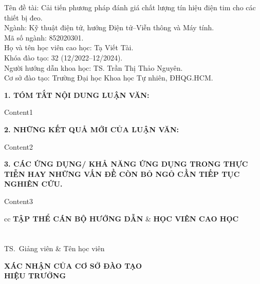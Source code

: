 \begin{flushleft}
	Tên đề tài: Cải tiến phương pháp đánh giá chất lượng tín hiệu điện tim cho các thiết bị đeo. \\
	Ngành: Kỹ thuật điện tử, hướng Điện tử--Viễn thông và Máy tính. \\
	Mã số ngành: 852020301. \\
	Họ và tên học viên cao học: Tạ Viết Tài. \\
	Khóa đào tạo: 32 (12/2022--12/2024). \\
	Người hướng dẫn khoa học: TS. Trần Thị Thảo Nguyên.\\
	Cơ sở đào tạo: Trường Đại học Khoa học Tự nhiên, ĐHQG.HCM. \\
\end{flushleft}

\textbf{1. TÓM TẮT NỘI DUNG LUẬN VĂN:}

Content1

\textbf{2. NHỮNG KẾT QUẢ MỚI CỦA LUẬN VĂN:}

Content2

\textbf{3. CÁC ỨNG DỤNG/ KHẢ NĂNG ỨNG DỤNG TRONG THỰC TIỄN HAY NHỮNG VẤN ĐỀ CÒN BỎ NGỎ CẦN TIẾP TỤC NGHIÊN CỨU.}

Content3


\vspace{1.5em}
\begin{tblr}{cc}
	\centering
	\textbf{TẬP THỂ CÁN BỘ HƯỚNG DẪN} & \textbf{\hspace{5.0em}HỌC VIÊN CAO HỌC} \\
	\\
	\\
	TS.~Giảng viên                   & \hspace{5.0em} Tên học viên
\end{tblr}

\vspace{2.5em}
\begin{center}
	\textbf{XÁC NHẬN CỦA CƠ SỞ ĐÀO TẠO} \\
	\textbf{HIỆU TRƯỞNG}
\end{center}